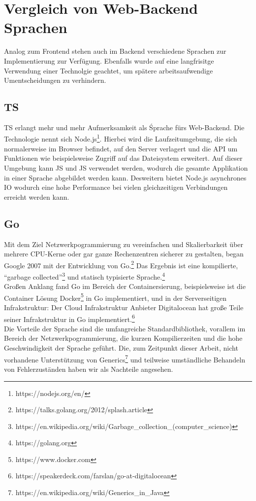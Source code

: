 \section{Vergleich von Web-Backend Sprachen}
Analog zum Frontend stehen auch im Backend verschiedene Sprachen zur
Implementierung zur Verfügung. Ebenfalls wurde auf eine langfrisitge Verwendung
einer Technolgie geachtet, um spätere arbeitsaufwendige Umentscheidungen zu verhindern.
\subsection{\acl{TS}}
\acl{TS} erlangt mehr und mehr Aufmerksamkeit als Śprache fürs Web-Backend. Die
Technologie nennt sich Node.js\footnote{https://nodejs.org/en/}. Hierbei wird
die Laufzeitumgebung, die sich normalerweise im Browser befindet, auf den Server
verlagert und die \ac{API} um Funktionen wie beispielsweise Zugriff auf das
Dateisystem erweitert. Auf dieser Umgebung kann \ac{JS} und \ac{JS} verwendet
werden, wodurch die gesamte Applikation in einer Sprache abgebildet werden kann.
Desweitern bietet Node.js asynchrones \ac{IO} wodurch eine hohe Performance bei
vielen gleichzeitigen Verbindungen erreicht werden kann.
\subsection{Go}
Mit dem Ziel Netzwerkpogrammierung zu vereinfachen und Skalierbarkeit über
mehrere CPU-Kerne oder gar ganze Rechenzentren sicherer zu
gestalten, began Google 2007 mit der Entwicklung von Go.\footnote{https://talks.golang.org/2012/splash.article} Das Ergebnis
ist eine kompilierte, ``garbage
collected''\footnote{https://en.wikipedia.org/wiki/Garbage\_collection\_(computer\_science)}
und statisch typisierte Sprache.\footnote{https://golang.org}\\
Großen Anklang fand Go im Bereich der Containersierung, beispielsweise ist die
Container Lösung Docker\footnote{https://www.docker.com} in Go implementiert, und in der Serverseitigen
Infrakstruktur: Der Cloud Infrakstruktur Anbieter Digitalocean hat große Teile
seiner Infrakstruktur in Go
implementiert.\footnote{https://speakerdeck.com/farslan/go-at-digitalocean}\\
Die Vorteile der Sprache sind die umfangreiche Standardbibliothek, vorallem im
Bereich der Netzwerkpogrammierung, die kurzen Kompilierzeiten und die hohe
Geschwindigkeit der Sprache geführt. Die, zum Zeitpunkt dieser Arbeit, nicht vorhandene Unterstützung von Generics\footnote{https://en.wikipedia.org/wiki/Generics\_in\_Java}
und teilweise umständliche Behandeln von Fehlerzuständen haben wir als Nachteile angesehen.
